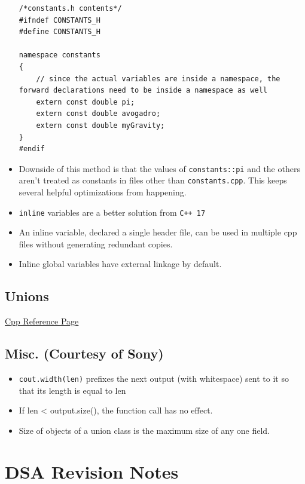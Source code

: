 \documentclass{report}
\begin{document}
\begin{itemize}
\begin{lstlisting}
/*constants.h contents*/
#ifndef CONSTANTS_H
#define CONSTANTS_H

namespace constants
{
    // since the actual variables are inside a namespace, the forward declarations need to be inside a namespace as well
    extern const double pi;
    extern const double avogadro;
    extern const double myGravity;
}
#endif
\end{lstlisting}
\item Downside of this method is that the values of \texttt{constants::pi} and the others aren't treated as constants in files other than \texttt{constants.cpp}. This keeps several helpful optimizations from happening.
\item \texttt{inline} variables are a better solution from \texttt{C++ 17}
\item An inline variable, declared a single header file, can be used in multiple cpp files without generating redundant copies.
\item Inline global variables have external linkage by default.
\end{itemize}

\section{Unions}
\href{https://en.cppreference.com/w/cpp/language/union}{Cpp Reference Page}
\section{Misc. (Courtesy of Sony)}
\begin{itemize}
\item \texttt{cout.width(len)} prefixes the next output (with whitespace) sent to it so that its length is equal to len
\item If len < output.size(), the function call has no effect.
\end{itemize}
\begin{itemize}
\item Size of objects of a union class is the maximum size of any one field.
\end{itemize}
\chapter{DSA Revision Notes}
\end{document}
